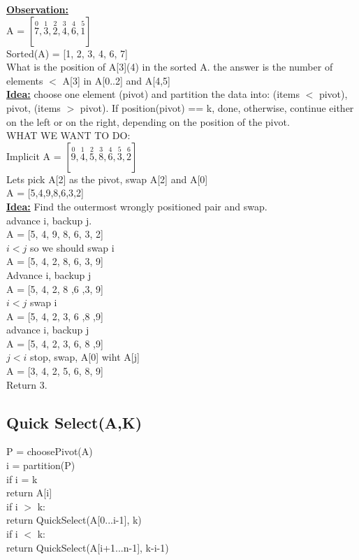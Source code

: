 \documentclass[12pt]{article}
\newcommand{\myt}[1]{\textbf{\underline{#1}}}
\begin{document}
	\myt{Observation:}\\
	A = $[\overset{0}{7}, \overset{1}{3}, \overset{2}{2}, \overset{3}{4}, \overset{4}{6}, \overset{5}{1}]$\\
	Sorted(A) = [1, 2, 3, 4, 6, 7]\\
	What is the position of A[3](4) in the sorted A. the answer is the number of elements $<$ A[3] in A[0..2] and A[4,5]\\
	
	\myt{Idea:} choose one element (pivot) and partition the data into: (items $<$ pivot), pivot, (items $>$ pivot). If position(pivot) == k, done, otherwise, continue either on the left or on the right, depending on the position of the pivot.\\
	
	WHAT WE WANT TO DO:\\
	
	Implicit A = $[\overset{0}{9}, \overset{1}{4}, \overset{2}{5}, \overset{3}{8}, \overset{4}{6}, \overset{5}{3}, \overset{6}{2}]$\\
	
	Lets pick A[2] as the pivot, swap A[2] and A[0]\\
	A = [5,4,9,8,6,3,2]\\
	
	\myt{Idea:} Find the outermost wrongly positioned pair and swap.\\
	
	advance i, backup j.\\
	A = [5, 4, 9, 8, 6, 3, 2]\\
	$i < j$ so we should swap i\\
	A = [5, 4, 2, 8, 6, 3, 9]\\
	Advance i, backup j\\
	A = [5, 4, 2, 8 ,6 ,3, 9]\\
	$i < j$ swap i\\
	A = [5, 4, 2, 3, 6 ,8 ,9]\\
	advance i, backup j\\
	A = [5, 4, 2, 3, 6, 8 ,9]\\
	$j < i$ stop, swap, A[0] wiht A[j]\\
	A = [3, 4, 2, 5, 6, 8, 9]\\
	Return 3.\\
	
	\subsection*{Quick Select(A,K)}
	P = choosePivot(A)\\
	i = partition(P)\\
	if i = k\\
	return A[i]\\
	if i $>$ k:\\
	return QuickSelect(A[0...i-1], k)\\
	if i $<$ k:\\
	return QuickSelect(A[i+1...n-1], k-i-1)\\
	
\end{document}
